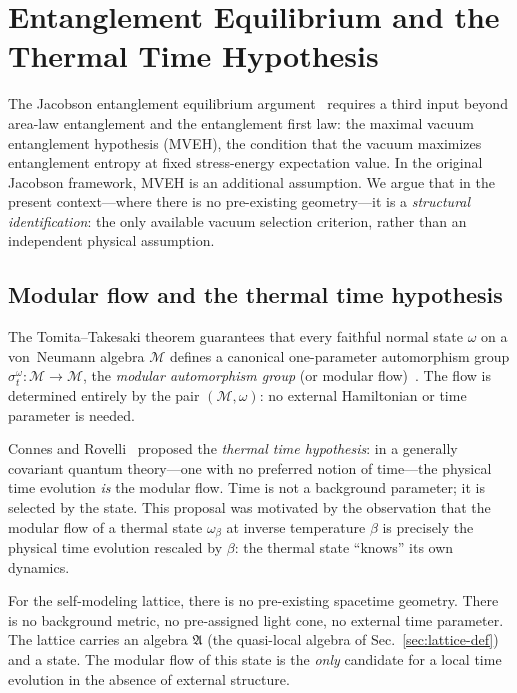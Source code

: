 \section{Entanglement Equilibrium and the Thermal Time Hypothesis}
\label{sec:equilibrium}

The Jacobson entanglement equilibrium argument~\cite{Jacobson2016}
requires a third input beyond area-law entanglement and the
entanglement first law: the maximal vacuum entanglement hypothesis
(MVEH), the condition that the vacuum maximizes entanglement entropy at
fixed stress-energy expectation value.  In the original Jacobson
framework, MVEH is an additional assumption.  We argue that in the
present context---where there is no pre-existing geometry---it is
a \emph{structural identification}: the only available vacuum selection
criterion, rather than an independent physical assumption.

\subsection{Modular flow and the thermal time hypothesis}
\label{sec:thermal-time}

The Tomita--Takesaki theorem guarantees that every faithful normal
state $\omega$ on a von~Neumann algebra $\mathcal{M}$ defines a
canonical one-parameter automorphism group
$\sigma_t^\omega : \mathcal{M} \to \mathcal{M}$, the \emph{modular
automorphism group} (or modular flow)~\cite{BratteliRobinson1997}.
The flow is determined entirely by the pair $(\mathcal{M}, \omega)$:
no external Hamiltonian or time parameter is needed.

Connes and Rovelli~\cite{ConnesRovelli1994} proposed the \emph{thermal
time hypothesis}: in a generally covariant quantum theory---one with
no preferred notion of time---the physical time evolution \emph{is}
the modular flow.  Time is not a background parameter; it is selected
by the state.  This proposal was motivated by the observation that the
modular flow of a thermal state $\omega_\beta$ at inverse temperature
$\beta$ is precisely the physical time evolution rescaled by $\beta$:
the thermal state ``knows'' its own dynamics.

For the self-modeling lattice, there is no pre-existing spacetime
geometry.  There is no background metric, no pre-assigned light cone,
no external time parameter.  The lattice carries an algebra
$\mathfrak{A}$ (the quasi-local algebra of
Sec.~\ref{sec:lattice-def}) and a state.  The modular flow of this
state is the \emph{only} candidate for a local time evolution in the
absence of external structure.

